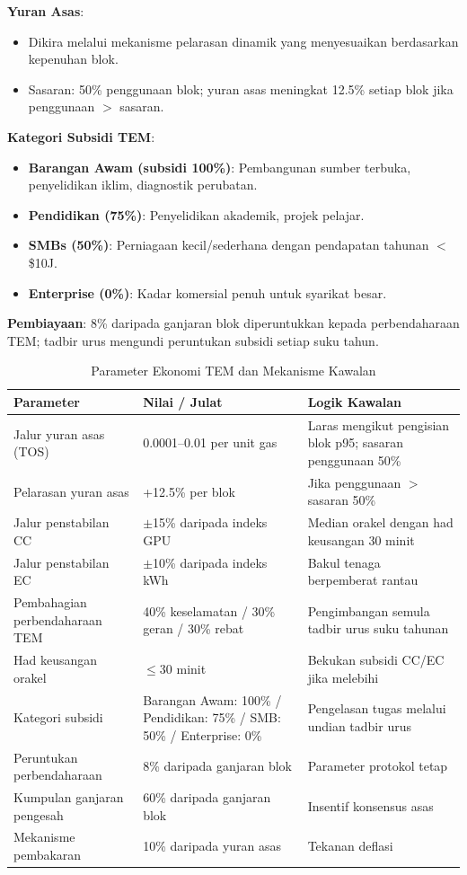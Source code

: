 \documentclass[11pt]{article}
\begin{document}
\textbf{Yuran Asas}:
\begin{itemize}[noitemsep]
  \item Dikira melalui mekanisme pelarasan dinamik yang menyesuaikan berdasarkan kepenuhan blok.
  \item Sasaran: 50\% penggunaan blok; yuran asas meningkat 12.5\% setiap blok jika penggunaan $>$ sasaran.
\end{itemize}

\textbf{Kategori Subsidi TEM}:
\begin{itemize}[noitemsep]
  \item \textbf{Barangan Awam (subsidi 100\%)}: Pembangunan sumber terbuka, penyelidikan iklim, diagnostik perubatan.
  \item \textbf{Pendidikan (75\%)}: Penyelidikan akademik, projek pelajar.
  \item \textbf{SMBs (50\%)}: Perniagaan kecil/sederhana dengan pendapatan tahunan $<$\$10J.
  \item \textbf{Enterprise (0\%)}: Kadar komersial penuh untuk syarikat besar.
\end{itemize}

\textbf{Pembiayaan}: 8\% daripada ganjaran blok diperuntukkan kepada perbendaharaan TEM; tadbir urus mengundi peruntukan subsidi setiap suku tahun.

\begin{table}[H]
\centering
\caption{Parameter Ekonomi TEM dan Mekanisme Kawalan}
\label{tab:tem-parameters}
\begin{tabular}{@{}p{}p{}p{}@{}}
\toprule
\textbf{Parameter} & \textbf{Nilai / Julat} & \textbf{Logik Kawalan} \\ \midrule
Jalur yuran asas (TOS) & 0.0001--0.01 per unit gas & Laras mengikut pengisian blok p95; sasaran penggunaan 50\% \\
Pelarasan yuran asas & +12.5\% per blok & Jika penggunaan $>$ sasaran 50\% \\
Jalur penstabilan CC & $\pm$15\% daripada indeks GPU & Median orakel dengan had keusangan 30 minit \\
Jalur penstabilan EC & $\pm$10\% daripada indeks kWh & Bakul tenaga berpemberat rantau \\
Pembahagian perbendaharaan TEM & 40\% keselamatan / 30\% geran / 30\% rebat & Pengimbangan semula tadbir urus suku tahunan \\
Had keusangan orakel & $\le$30 minit & Bekukan subsidi CC/EC jika melebihi \\
Kategori subsidi & Barangan Awam: 100\% / Pendidikan: 75\% / SMB: 50\% / Enterprise: 0\% & Pengelasan tugas melalui undian tadbir urus \\
Peruntukan perbendaharaan & 8\% daripada ganjaran blok & Parameter protokol tetap \\
Kumpulan ganjaran pengesah & 60\% daripada ganjaran blok & Insentif konsensus asas \\
Mekanisme pembakaran & 10\% daripada yuran asas & Tekanan deflasi \\
\bottomrule
\end{tabular}
\end{table}
\end{document}
